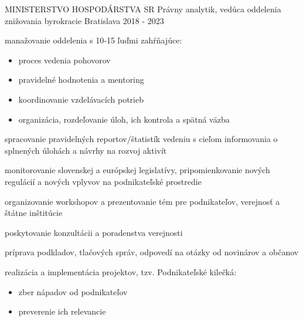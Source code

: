 

\begin{cventries}

  \cventry
    {MINISTERSTVO HOSPODÁRSTVA SR} %
    {Právny analytik, vedúca oddelenia znižovania byrokracie} %
    {Bratislava} %
    {2018 - 2023} %
    {
      \begin{cvitems} %
        \item {manažovanie oddelenia s 10‐15 ľuďmi zahŕňajúce:}
        \begin{itemize}[leftmargin=3ex, label=\bullet]
          \item {proces vedenia pohovorov}
          \item {pravidelné hodnotenia a mentoring}
          \item {koordinovanie vzdelávacích potrieb}
          \item {organizácia, rozdeľovanie úloh, ich kontrola a spätná väzba}
        \end{itemize}
        \item {spracovanie pravidelných reportov/štatistík vedeniu s cieľom informovania o splnených úlohách a návrhy na rozvoj aktivít}
        \item {monitorovanie slovenskej a európskej legislatívy, pripomienkovanie nových regulácií a nových vplyvov na podnikateľské prostredie}
        \item {organizovanie workshopov a prezentovanie tém pre podnikateľov, verejnosť a štátne inštitúcie}
        \item {poskytovanie konzultácii a poradenstva verejnosti}
        \item {príprava podkladov, tlačových správ, odpovedí na otázky od novinárov a občanov}
        \item {realizácia a implementácia projektov, tzv. Podnikateľské kilečká:}
        \begin{itemize}[leftmargin=3ex, label=\bullet]
          \item {zber nápadov od podnikateľov}
          \item {preverenie ich relevancie}

\end{itemize}
\end{cvitems}}
\end{cventries}
